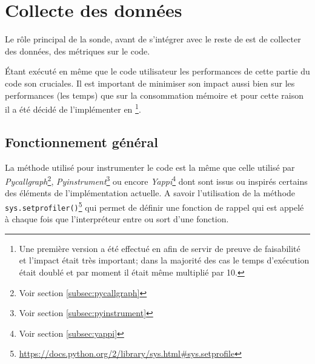   
  \chapter[Collecte]{Collecte des données}
Le rôle principal de la sonde, avant de s'intégrer avec le reste de \Blackfire est de collecter des données, des métriques sur le code.

Étant exécuté en même que le code utilisateur les performances de cette partie du code son cruciales. Il est important de minimiser son impact aussi bien sur les performances (les temps) que sur la consommation mémoire et pour cette raison il a été décidé de l'implémenter en \C\footnote{Une première version a été effectué en \Python afin de servir de preuve de faisabilité et l'impact était très important; dans la majorité des cas le temps d'exécution était doublé et par moment il était même multiplié par 10.}.

  \section{Fonctionnement général}
La méthode utilisé pour instrumenter le code \Python est la même que celle utilisé par \emph{Pycallgraph}\footnote{Voir section \vref{subsec:pycallgraph}}, \emph{Pyinstrument}\footnote{Voir section \vref{subsec:pyinstrument}} ou encore \emph{Yappi}\footnote{Voir section \vref{subsec:yappi}} dont sont issus ou inspirés certains des éléments de l'implémentation actuelle. A savoir l'utilisation de la méthode \verb|sys.setprofiler()|\footnote{\url{https://docs.python.org/2/library/sys.html#sys.setprofile}} qui permet de définir une fonction de rappel qui est appelé à chaque fois que l'interpréteur entre ou sort d'une fonction.

